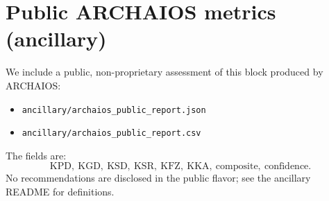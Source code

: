 \section{Public ARCHAIOS metrics (ancillary)}\label{app:archaios}
We include a public, non-proprietary assessment of this block produced by ARCHAIOS:
\begin{itemize}
\item \texttt{ancillary/archaios_public_report.json}
\item \texttt{ancillary/archaios_public_report.csv}
\end{itemize}
The fields are:
\[
\mathrm{KPD},\ \mathrm{KGD},\ \mathrm{KSD},\ \mathrm{KSR},\ \mathrm{KFZ},\ \mathrm{KKA},\ \text{composite},\ \text{confidence}.
\]
No recommendations are disclosed in the public flavor; see the ancillary README for definitions.
